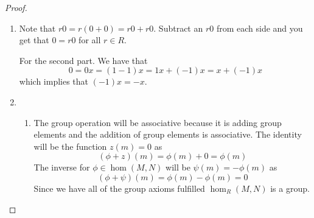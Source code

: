 \documentclass[10pt]{article}
\theoremstyle{plain}
\theoremstyle{remark}
\begin{document}
\begin{proof}
  \begin{enumerate}
  \item Note that $r0=r(0+0)=r0+r0$. Subtract an $r0$ from each side
    and you get that $0=r0$ for all $r\in R$.

    For the second part. We have that
    \[ 0= 0x = (1-1)x = 1x + (-1)x = x + (-1)x \]
    which implies that $(-1)x=-x$.
  \item
    \begin{enumerate}
    \item The group operation will be associative because it is adding group elements
      and the addition of group elements is associative. The identity will be
      the function $z(m)=0$ as
      \[ (\phi+z)(m)=\phi(m)+0=\phi(m) \]
      The inverse for $\phi\in\hom(M,N)$ will be $\psi(m)=-\phi(m)$ as
      \[ (\phi+\psi)(m)=\phi(m)-\phi(m)=0 \]
      Since we have all of the group axioms fulfilled $\hom_R(M,N)$ is a group.


\end{enumerate}
\end{enumerate}
\end{proof}
\end{document}
